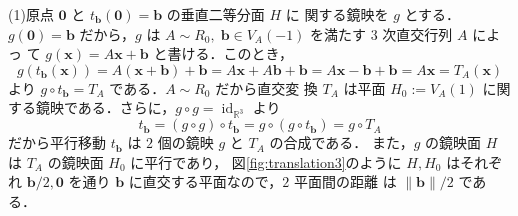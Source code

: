 \documentclass[11pt, uplatex, dvipdfmx, titlepage]{jsarticle}
\makeatletter
\DeclareMathOperator{\Inv}{Inv}
\DeclareMathOperator{\id}{id}
\renewenvironment{proof}[1][\proofname]{\par
  \pushQED{\qed}%
  \normalfont \topsep6\p@\@plus6\p@\relax
  \trivlist
  \item[\hskip\labelsep
         \bfseries
    {#1}]\ignorespaces
}{%
  \popQED\endtrivlist\@endpefalse
}
\theoremstyle{definition}
\renewcommand{\proofname}{\textbf{証明}}
\makeatother
\begin{document}
\begin{proof}
  (1)原点 $\bm{0}$ と $t_{\bm{b}}(\bm{0})=\bm{b}$ の垂直二等分面 $H$ に
  関する鏡映を $g$ とする．$g(\bm{0})=\bm{b}$ だから，$g$ は
  $A \sim R_0, \; \bm{b} \in V_A(-1)$ を満たす $3$ 次直交行列 $A$ によっ
  て $g(\bm{x}) = A\bm{x} + \bm{b}$ と書ける．このとき，
  \[
    g\left( t_{\bm{b}}(\bm{x})\right) = A(\bm{x}+\bm{b})+\bm{b} =
    A\bm{x} + A\bm{b} + \bm{b} = A\bm{x} -\bm{b} +\bm{b}=A\bm{x} = T_A(\bm{x})
  \]
  より $g\circ t_{\bm{b}} = T_A$ である．$A \sim R_0$ だから直交変
  換 $T_A$ は平面 $H_0:=V_A(1)$ に関する鏡映である．さらに，$g\circ g =
  \id_{\mathbb{R}^3}$ より
  \[
    t_{\bm{b}}= \left( g \circ g\right) \circ t_{\bm{b}} = g\circ \left( g \circ t_{\bm{b}}\right) = g \circ T_A
  \]
  だから平行移動 $t_{\bm{b}}$ は $2$ 個の鏡映 $g$ と $T_A$ の合成である．
  また，$g$ の鏡映面 $H$ は $T_A$ の鏡映面 $H_0$ に平行であり，
  図\ref{fig:translation3}のように $H, H_0$ はそれぞれ $\bm{b}/2,
  \bm{0}$ を通り $\bm{b}$ に直交する平面なので，$2$ 平面間の距離
  は $\|\bm{b}\|/2$ である．

\end{proof}
\end{document}
